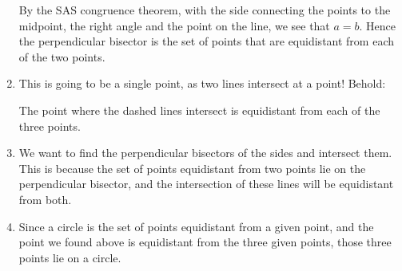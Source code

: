 \documentclass[nooutcomes,noauthor,handout]{ximera}
\begin{document}
\begin{question}
\begin{freeResponse}
\begin{enumerate}
\begin{center}
      \end{center}
      By the SAS congruence theorem, with the side connecting the
      points to the midpoint, the right angle and the point on the
      line, we see that $a=b$. Hence the perpendicular bisector is the
      set of points that are equidistant from each of the two points.
    \item This is going to be a single point, as two lines intersect
      at a point! Behold:
      \begin{center}
      \end{center}
      The point where the dashed lines intersect is equidistant from
      each of the three points.
    \item We want to find the perpendicular bisectors of the sides and
      intersect them. This is because the set of points equidistant
      from two points lie on the perpendicular bisector, and the
      intersection of these lines will be equidistant from both.
    \item Since a circle is the set of points equidistant from a given
      point, and the point we found above is equidistant from the
      three given points, those three points lie on a circle.
    \end{enumerate}
  \end{freeResponse}
\end{question}
\end{document}
